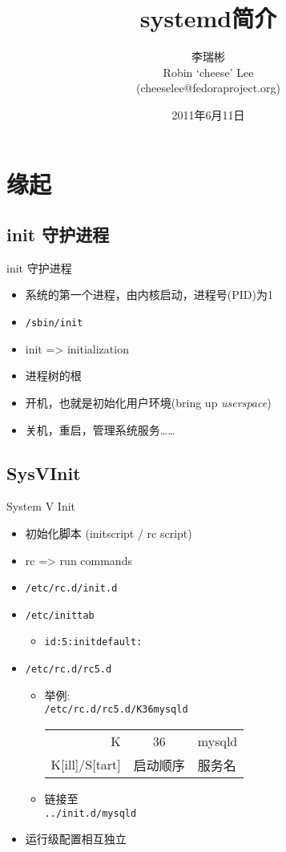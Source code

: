 \documentclass[CJK,xetex]{beamer}
\title{systemd简介}
\author[李瑞彬]{李瑞彬\\Robin `cheese' Lee\\
(cheeselee@fedoraproject.org)}
\date{2011年6月11日}
\newcommand{\mydir}[1]{{\color{red} \texttt{#1}}}
\newcommand{\myfile}[1]{{\color{purple} \texttt{#1}}}
\begin{document}
\frame{\titlepage}


\section{缘起}
\subsection{init 守护进程}
\begin{frame}{init 守护进程}
\begin{itemize}[<+->]
  \item 系统的第一个进程，由内核启动，进程号(PID)为1
  \item \myfile{/sbin/init}
  \item init => initialization
  \item 进程树的根
  \item 开机，也就是初始化用户环境(bring up \emph{userspace})
  \item 关机，重启，管理系统服务……
\end{itemize}
\end{frame}

\subsection{SysVInit}
\begin{frame}{System V Init}
  \begin{itemize}[<+->]
  \item 初始化脚本 (initscript / rc script)
  \item rc => run commands
  \item \mydir{/etc/rc.d/init.d}
  \item \mydir{/etc/inittab}
    \begin{itemize}
    \item \texttt{id:5:initdefault:}
    \end{itemize}
  \item \mydir{/etc/rc.d/rc5.d}
    \begin{itemize}
  \item 举例:\\
    \myfile{/etc/rc.d/rc5.d/K36mysqld}
    \begin{tabular}[]{r|c|l}
      \hline
      K & 36 & mysqld \\
      K[ill]/S[tart] & 启动顺序 & 服务名\\
      \hline
    \end{tabular}
  \item 链接至\\
    \myfile{../init.d/mysqld}\\
  \end{itemize}
\item 运行级配置相互独立
  \end{itemize}
\end{frame}
\end{document}
